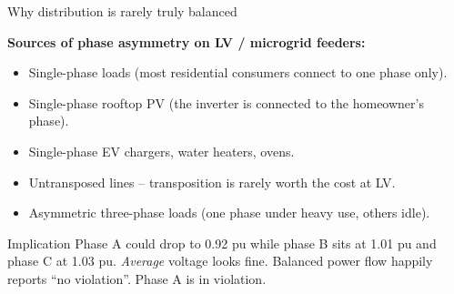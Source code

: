 \documentclass[aspectratio=169,10pt]{beamer}
\begin{document}
\begin{frame}{Why distribution is rarely truly balanced}
\centering
{}
\vspace{0.4em}
\textbf{Sources of phase asymmetry on LV / microgrid feeders:}
\begin{itemize}
  \item Single-phase loads (most residential consumers connect to one phase only).
  \item Single-phase rooftop PV (the inverter is connected to the homeowner's phase).
  \item Single-phase EV chargers, water heaters, ovens.
  \item Untransposed lines -- transposition is rarely worth the cost at LV.
  \item Asymmetric three-phase loads (one phase under heavy use, others idle).
\end{itemize}
\vspace{0.4em}
\begin{alertblock}{Implication}
Phase A could drop to 0.92 pu while phase B sits at 1.01 pu and phase C at 1.03 pu. \emph{Average} voltage looks fine. Balanced power flow happily reports ``no violation''. Phase A is in violation.
\end{alertblock}
\end{frame}
\end{document}
